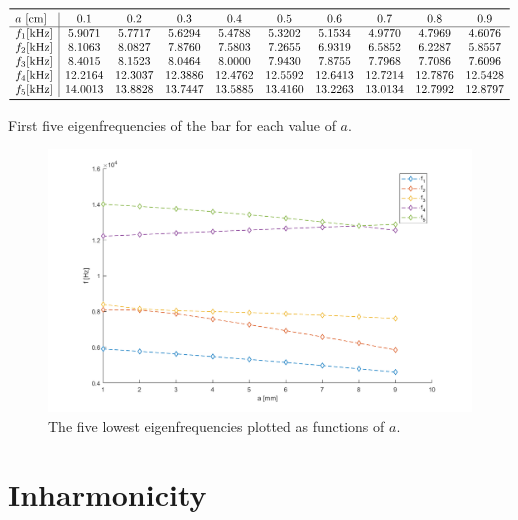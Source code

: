 \documentclass[a4paper]{article}
\begin{document}
\begin{table}[h]
	\centering
	$\begin{array}{l|ccccccccc}
		\toprule
		 a~[\si{\centi\meter}] & 0.1 & 0.2 & 0.3 & 0.4 & 0.5 & 0.6 & 0.7 & 0.8 & 0.9\\
		 \hline
		 f_1[\si{\kilo\hertz}]&5.9071  &  5.7717  &  5.6294  &  5.4788   & 5.3202 &   5.1534  &  4.9770  &  4.7969   & 4.6076\\
		 f_2[\si{\kilo\hertz}]&8.1063   & 8.0827 &   7.8760  &  7.5803  &  7.2655 &   6.9319  &  6.5852  &  6.2287 &   5.8557\\
		 f_3[\si{\kilo\hertz}]&8.4015  &  8.1523  &  8.0464  &  8.0000  &  7.9430 &   7.8755 &   7.7968  &  7.7086 &   7.6096\\
		 f_4[\si{\kilo\hertz}]&12.2164 &  12.3037 &  12.3886  & 12.4762 &  12.5592 &  12.6413 &  12.7214  & 12.7876 &   12.5428\\
		 f_5[\si{\kilo\hertz}]&14.0013  & 13.8828 &  13.7447  & 13.5885  & 13.4160&   13.2263 &  13.0134 &  12.7992 &  12.8797\\
		 \bottomrule
	\end{array}$
	\caption{First five eigenfrequencies of the bar for each value of $a$.}
	\label{tab:freqs}
\end{table}

\begin{figure}[h]
	\centering
	\includegraphics[width=0.85\linewidth]{freqz.png}
	\caption{The five lowest eigenfrequencies plotted as functions of $a$.}
	\label{fig:freqz}
\end{figure}




\section{Inharmonicity}
\end{document}

